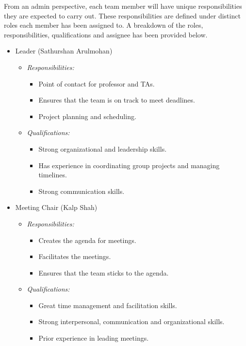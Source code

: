 \documentclass{article}
\begin{document}
From an admin perspective, each team member will have unique responsibilities
they are expected to carry out. These responsibilities are defined under 
distinct roles each member has been assigned to. A breakdown of the roles, 
responsibilities, qualifications and assignee has been provided below. 

\begin{itemize}
  \item Leader (Sathurshan Arulmohan)
    \begin{itemize}
      \item \textit{Responsibilities:}
        \begin{itemize}
          \item Point of contact for professor and TAs. 
          \item Ensures that the team is on track to meet deadlines.
          \item Project planning and scheduling.
        \end{itemize}
      \item \textit{Qualifications:}
        \begin{itemize}
          \item Strong organizational and leadership skills. 
          \item Has experience in coordinating group projects and managing
          timelines. 
          \item Strong communication skills. 
        \end{itemize}
    \end{itemize}
  \item Meeting Chair (Kalp Shah)
    \begin{itemize}
      \item \textit{Responsibilities:}
        \begin{itemize}
          \item Creates the agenda for meetings.
          \item Facilitates the meetings.
          \item Ensures that the team sticks to the agenda.
        \end{itemize}
      \item \textit{Qualifications:}
        \begin{itemize}
          \item Great time management and facilitation skills. 
          \item Strong interpersonal, communication and organizational skills. 
          \item Prior experience in leading meetings. 

\end{itemize}
\end{itemize}
\end{itemize}
\end{document}
